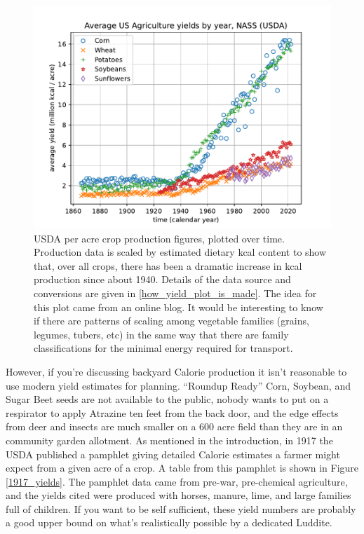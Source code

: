 \documentclass[prb,preprint]{revtex4-2}
\begin{document}
\begin{figure}[ht!]
\centering
\includegraphics[width=\columnwidth]{kcal_per_acre_yields.pdf}
\caption{
USDA per acre crop production figures, plotted over time.  Production data is scaled by estimated dietary kcal content to show that, over all crops, there has been a dramatic increase in kcal production since about 1940.  
Details of the data source and conversions are given in \ref{how_yield_plot_is_made}.
The idea for this plot came from an online blog.\cite{math_encounters}  
It would be interesting to know if there are patterns of scaling among vegetable families (grains, legumes, tubers, etc) in the same way that there are family classifications for the minimal energy required for transport. \cite{energetic_cost_of_moving}
}
\label{ag_yields}
\end{figure}

However, if you're discussing backyard Calorie production it isn't reasonable to use modern yield estimates for planning.  ``Roundup Ready'' Corn, Soybean, and Sugar Beet seeds are not available to the public, nobody wants to put on a respirator to apply Atrazine ten feet from the back door,  and the edge effects from deer and insects are much smaller on a $600$ acre field than they are in an community garden allotment.  As mentioned in the introduction, in 1917 the USDA published a pamphlet\cite{USDA_1917_yields_pamphlet} giving detailed Calorie estimates a farmer might expect from a given acre of a crop.  A table from this pamphlet is shown in Figure \ref{1917_yields}.  
The pamphlet data came from pre-war, pre-chemical agriculture, and the yields cited were produced with horses, manure, lime, and large families full of children.  If you want to be self sufficient, these yield numbers are probably a good upper bound on what's realistically possible by a dedicated Luddite.  
\end{document}
